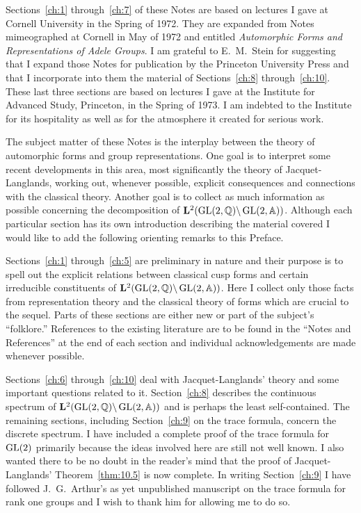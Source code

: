 Sections~\ref{ch:1} through~\ref{ch:7} of these Notes are based on lectures I gave at Cornell University in the Spring of 1972. They are expanded from Notes mimeographed at Cornell in May of 1972 and entitled \emph{Automorphic Forms and Representations of Adele Groups}. I am grateful to E.~M.~Stein for suggesting that I expand those Notes for publication by the Princeton University Press and that I incorporate into them the material of Sections~\ref{ch:8} through~\ref{ch:10}. These last three sections are based on lectures I gave at the Institute for Advanced Study, Princeton, in the Spring of 1973. I am indebted to the Institute for its hospitality as well as for the atmosphere it created for serious work.

The subject matter of these Notes is the interplay between the theory of automorphic forms and group representations. One goal is to interpret some recent developments in this area, most significantly the theory of Jacquet-Langlands, working out, whenever possible, explicit consequences and connections with the classical theory. Another goal is to collect as much information as possible concerning the decomposition of $\mathbf{L}^{2}(\operatorname{GL}(2,\mathbb{Q})\backslash \operatorname{GL}(2,\mathbb{A}))$. Although each particular section has its own introduction describing the material covered I would like to add the following orienting remarks to this Preface.

Sections~\ref{ch:1} through~\ref{ch:5} are preliminary in nature and their purpose is to spell out the explicit relations between classical cusp forms and certain irreducible constituents of $\mathbf{L}^{2}(\operatorname{GL}(2,\mathbb{Q})\backslash \operatorname{GL}(2,\mathbb{A}))$. Here I collect only those facts from representation theory and the classical theory of forms which are crucial to the sequel. Parts of these sections are either new or part of the subject's ``folklore.'' References to the existing literature are to be found in the ``Notes and References'' at the end of each section and individual acknowledgements are made whenever possible.

Sections~\ref{ch:6} through~\ref{ch:10} deal with Jacquet-Langlands' theory and some important questions related to it. Section~\ref{ch:8} describes the continuous spectrum of $\mathbf{L}^{2}(\operatorname{GL}(2,\mathbb{Q})\backslash \operatorname{GL}(2,\mathbb{A}))$ and is perhaps the least self-contained. The remaining sections, including Section~\ref{ch:9} on the trace formula, concern the discrete spectrum. I have included a complete proof of the trace formula for $\operatorname{GL}(2)$ primarily because the ideas involved here are still not well known. I also wanted there to be no doubt in the reader's mind that the proof of Jacquet-Langlands' Theorem~\ref{thm:10.5} is now complete. In writing Section~\ref{ch:9} I have followed J.~G.~Arthur's as yet unpublished manuscript on the trace formula for rank one groups and I wish to thank him for allowing me to do so.

